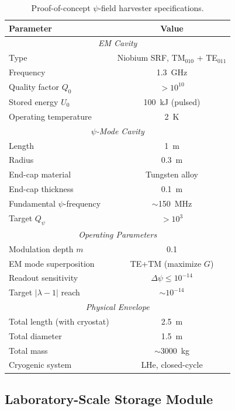 \documentclass[aps,prd,twocolumn,showpacs,preprintnumbers,superscriptaddress,nofootinbib]{revtex4-2}
\begin{document}
\begin{table}[h]
\caption{Proof-of-concept $\psi$-field harvester specifications.}
\label{tab:poc-specs}
\begin{ruledtabular}
\begin{tabular}{lc}
Parameter & Value \\
\hline
\multicolumn{2}{c}{\textit{EM Cavity}} \\
Type & Niobium SRF, TM$_{010}$ + TE$_{011}$ \\
Frequency & 1.3~GHz \\
Quality factor $Q_0$ & $> 10^{10}$ \\
Stored energy $U_0$ & 100~kJ (pulsed) \\
Operating temperature & 2~K \\
\hline
\multicolumn{2}{c}{\textit{$\psi$-Mode Cavity}} \\
Length & 1~m \\
Radius & 0.3~m \\
End-cap material & Tungsten alloy \\
End-cap thickness & 0.1~m \\
Fundamental $\psi$-frequency & $\sim$150~MHz \\
Target $Q_\psi$ & $> 10^3$ \\
\hline
\multicolumn{2}{c}{\textit{Operating Parameters}} \\
Modulation depth $m$ & 0.1 \\
EM mode superposition & TE+TM (maximize $G$) \\
Readout sensitivity & $\Delta\psi \leq 10^{-14}$ \\
Target $|\lambda-1|$ reach & $\sim 10^{-14}$ \\
\hline
\multicolumn{2}{c}{\textit{Physical Envelope}} \\
Total length (with cryostat) & 2.5~m \\
Total diameter & 1.5~m \\
Total mass & $\sim$3000~kg \\
Cryogenic system & LHe, closed-cycle \\
\end{tabular}
\end{ruledtabular}
\end{table}

\subsection{Laboratory-Scale Storage Module}\label{sec:lab-module}
\end{document}
